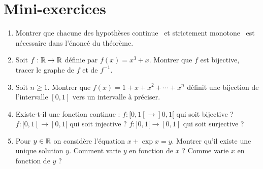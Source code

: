 \section{Mini-exercices}

\begin{frame}

\begin{miniexercice}
\begin{enumerate}
  \item Montrer que chacune des hypothèses \og continue \fg\  et \og strictement monotone \fg\ 
  est nécessaire dans l'énoncé du théorème.

  \item Soit $f : \mathbb{R} \to \mathbb{R}$ définie par $f(x)=x^3+x$. Montrer que $f$ est bijective, 
  tracer le graphe de $f$ et de $f^{-1}$.
  
  \item Soit $n \ge 1$. Montrer que $f(x)=1+x+x^2+\cdots+x^n$ définit une bijection 
  de l'intervalle $[0,1]$ vers un intervalle à préciser.
  
 
  \item Existe-t-il une fonction continue : $f: [0,1[ \to ]0,1[$ qui soit bijective ? 
  $f: [0,1[ \to ]0,1[$ qui soit injective ?  $f: ]0,1[ \to [0,1]$ qui soit surjective ?
  
  \item Pour $y \in \mathbb{R}$ on considère l'équation $x + \exp x =y$. 
  Montrer qu'il existe une unique solution $y$. Comment varie $y$ en fonction de $x$ ?
  Comme varie $x$ en fonction de $y$ ?
    
\end{enumerate}
\end{miniexercice}

\end{frame}

